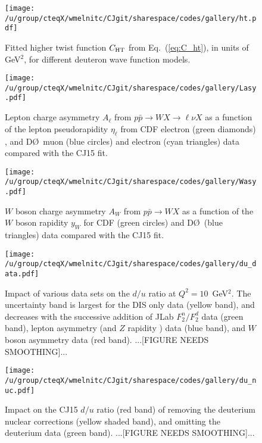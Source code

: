 \documentclass[aps,prd,amsmath,preprint]{revtex4}
\begin{document}
\begin{figure}[t]
\texttt{[image: /u/group/cteqX/wmelnitc/CJgit/sharespace/codes/gallery/ht.pdf]}
\caption{Fitted higher twist function $C_{\rm HT}$ from
	Eq.~(\ref{eq:C_ht}), in units of GeV$^2$, for different
	deuteron wave function models.}
\label{fig:Cht}
\end{figure}


\begin{figure}[t]
\texttt{[image: /u/group/cteqX/wmelnitc/CJgit/sharespace/codes/gallery/Lasy.pdf]}
\caption{Lepton charge asymmetry $A_{\ell}$ from
	$p\bar p \to W X \to \ell \nu X$ as a function of the
	lepton pseudorapidity $\eta_{\ell}$ from
	CDF electron (green diamonds) \cite{CDF_e}, and
	D\O\ muon (blue circles) \cite{D0_mu} and
	electron (cyan triangles) \cite{D0_e} data
	compared with the CJ15 fit.}
\label{fig:Lasy}
\end{figure} 

  
\begin{figure}[t]
\texttt{[image: /u/group/cteqX/wmelnitc/CJgit/sharespace/codes/gallery/Wasy.pdf]}
\caption{$W$ boson charge asymmetry $A_W$ from $p\bar p \to W X$
	as a function of the $W$ boson rapidity $y_W$ for
	CDF (green circles) \cite{CDF_W} and
	D\O\ (blue triangles) \cite{D0_W} data
	compared with the CJ15 fit.}
\label{fig:Wasy}
\end{figure} 


\begin{figure}[t]
\texttt{[image: /u/group/cteqX/wmelnitc/CJgit/sharespace/codes/gallery/du\_data.pdf]}
\caption{Impact of various data sets on the $d/u$ ratio at
	$Q^2=10$~GeV$^2$. The uncertainty band is largest for the
	  DIS only data (yellow band),
	and decreases with the successive addition of
	  JLab $F_2^n/F_2^d$ \cite{BONuS} data (green band),
	  lepton asymmetry \cite{CDF_e, D0_mu, D0_e}
	(and $Z$ rapidity \cite{CDFZ, D0Z}) data (blue band), and
	  $W$ boson asymmetry data \cite{CDF_W, D0_W} (red band).
	{\color{red}...[FIGURE NEEDS SMOOTHING]...}}
\label{fig:du_data}
\end{figure} 


\begin{figure}[t]
\texttt{[image: /u/group/cteqX/wmelnitc/CJgit/sharespace/codes/gallery/du\_nuc.pdf]}
\caption{Impact on the CJ15 $d/u$ ratio (red band) of removing the
	deuterium nuclear corrections (yellow shaded band),
	and omitting the deuterium data (green band).
	{\color{red}...[FIGURE NEEDS SMOOTHING]...}}
\label{fig:du_nuc}
\end{figure} 
\end{document}
